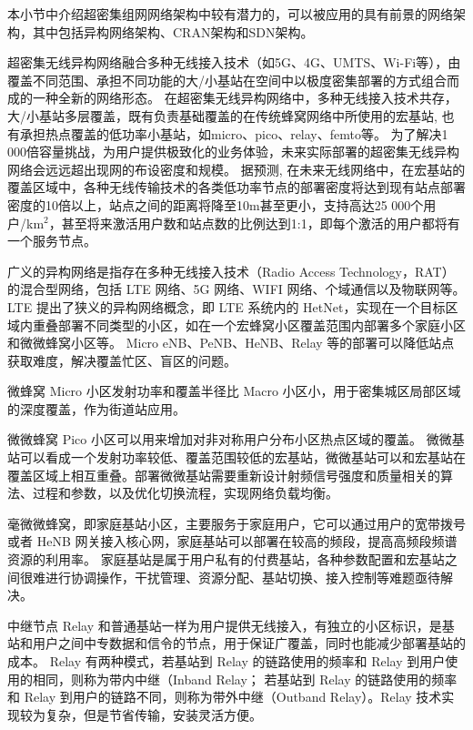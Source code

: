 本小节中介绍超密集组网网络架构中较有潜力的，可以被应用的具有前景的网络架构，其中包括异构网络架构、CRAN架构和SDN架构。

超密集无线异构网络融合多种无线接入技术（如5G、4G、UMTS、Wi-Fi等），由覆盖不同范围、承担不同功能的大/小基站在空间中以极度密集部署的方式组合而成的一种全新的网络形态。
在超密集无线异构网络中，多种无线接入技术共存，大/小基站多层覆盖，既有负责基础覆盖的在传统蜂窝网络中所使用的宏基站, 也有承担热点覆盖的低功率小基站，如micro、pico、relay、femto等。
为了解决1 000倍容量挑战，为用户提供极致化的业务体验，未来实际部署的超密集无线异构网络会远远超出现网的布设密度和规模。
据预测, 在未来无线网络中，在宏基站的覆盖区域中，各种无线传输技术的各类低功率节点的部署密度将达到现有站点部署密度的10倍以上，站点之间的距离将降至10m甚至更小，支持高达25 000个用户/km$^2$，甚至将来激活用户数和站点数的比例达到1:1，即每个激活的用户都将有一个服务节点。

广义的异构网络是指存在多种无线接入技术（Radio Access Technology，RAT）的混合型网络，包括 LTE 网络、5G 网络、WIFI 网络、个域通信以及物联网等。
LTE 提出了狭义的异构网络概念，即 LTE 系统内的 HetNet，实现在一个目标区域内重叠部署不同类型的小区，如在一个宏蜂窝小区覆盖范围内部署多个家庭小区和微微蜂窝小区等。
Micro eNB、PeNB、HeNB、Relay 等的部署可以降低站点获取难度，解决覆盖忙区、盲区的问题。

微蜂窝 Micro 小区发射功率和覆盖半径比 Macro 小区小，用于密集城区局部区域的深度覆盖，作为街道站应用。

微微蜂窝 Pico 小区可以用来增加对非对称用户分布小区热点区域的覆盖。
微微基站可以看成一个发射功率较低、覆盖范围较低的宏基站，微微基站可以和宏基站在覆盖区域上相互重叠。部署微微基站需要重新设计射频信号强度和质量相关的算法、过程和参数，以及优化切换流程，实现网络负载均衡。

毫微微蜂窝，即家庭基站小区，主要服务于家庭用户，它可以通过用户的宽带拨号或者 HeNB 网关接入核心网，家庭基站可以部署在较高的频段，提高高频段频谱资源的利用率。
家庭基站是属于用户私有的付费基站，各种参数配置和宏基站之间很难进行协调操作，干扰管理、资源分配、基站切换、接入控制等难题亟待解决。

中继节点 Relay 和普通基站一样为用户提供无线接入，有独立的小区标识，是基站和用户之间中专数据和信令的节点，用于保证广覆盖，同时也能减少部署基站的成本。
Relay 有两种模式，若基站到 Relay 的链路使用的频率和 Relay 到用户使用的相同，则称为带内中继（Inband Relay；
若基站到 Relay 的链路使用的频率和 Relay 到用户的链路不同，则称为带外中继（Outband Relay）。Relay 技术实现较为复杂，但是节省传输，安装灵活方便。


